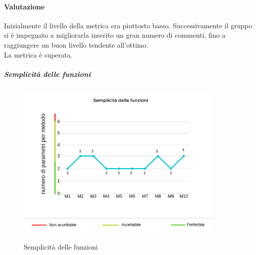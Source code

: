 	\paragraph*{Valutazione} Inizialmente il livello della metrica era piuttosto basso. Successivamente il gruppo si è impegnato a migliorarla inserito un gran numero di commenti, fino a raggiungere un buon livello tendente all'ottimo.
	\\ La metrica è superata.
	\pagebreak
	\subparagraph{Semplicità delle funzioni}
	\begin{center}
		\begin{figure}[h] 
			\centering 
			\includegraphics[width=0.90\textwidth]{res/images/new/semplicitaFunzioni.png}\\
			\caption{Semplicità delle funzioni}
		\end{figure}
	\end{center}
